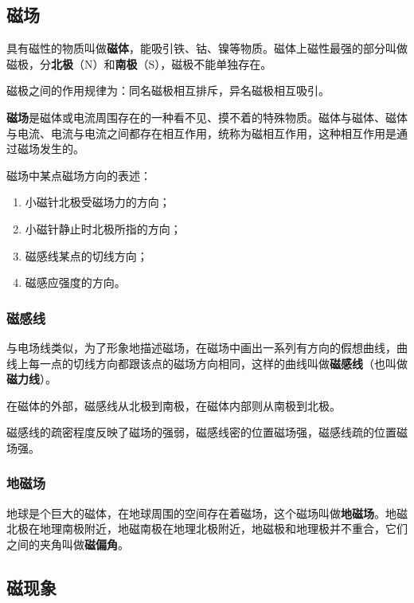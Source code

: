 
\begin{issues}
\issueDraft
\issueTODO
\end{issues}
\subsection{磁场}

具有磁性的物质叫做\textbf{磁体}，能吸引铁、钴、镍等物质。磁体上磁性最强的部分叫做磁极，分\textbf{北极}（$\mathrm N$）和\textbf{南极}（$\mathrm S$），磁极不能单独存在。

磁极之间的作用规律为：同名磁极相互排斥，异名磁极相互吸引。

\textbf{磁场}是磁体或电流周围存在的一种看不见、摸不着的特殊物质。磁体与磁体、磁体与电流、电流与电流之间都存在相互作用，统称为磁相互作用，这种相互作用是通过磁场发生的。

磁场中某点磁场方向的表述：

\begin{enumerate}
\item 小磁针北极受磁场力的方向；
\item 小磁针静止时北极所指的方向；
\item 磁感线某点的切线方向；
\item 磁感应强度的方向。
\end{enumerate}

\subsubsection{磁感线}
与电场线类似，为了形象地描述磁场，在磁场中画出一系列有方向的假想曲线，曲线上每一点的切线方向都跟该点的磁场方向相同，这样的曲线叫做\textbf{磁感线}（也叫做\textbf{磁力线}）。

在磁体的外部，磁感线从北极到南极，在磁体内部则从南极到北极。

磁感线的疏密程度反映了磁场的强弱，磁感线密的位置磁场强，磁感线疏的位置磁场强。

\subsubsection{地磁场}

地球是个巨大的磁体，在地球周围的空间存在着磁场，这个磁场叫做\textbf{地磁场}。地磁北极在地理南极附近，地磁南极在地理北极附近，地磁极和地理极并不重合，它们之间的夹角叫做\textbf{磁偏角}。

\subsection{磁现象}

